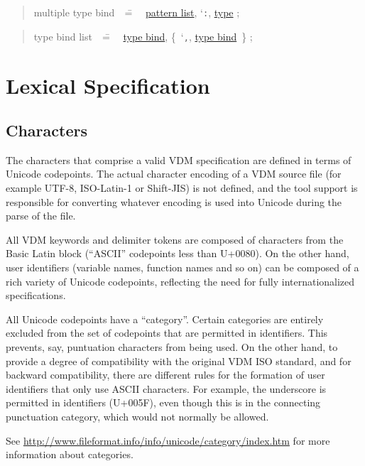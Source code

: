 \documentclass{overturerepchap}
\newcommand{\Lit}[1]{`{\tt #1}\Quote}
\newcommand{\Rule}[2]{
  \begin{quote}\begin{tabbing}
    #1\index{#1}\ \ \= = \ \ \= #2  ; %
    
  \end{tabbing}\end{quote}
  }
\newcommand{\RuleTarget}[1]{\hypertarget{rule:#1}{}}
\newcommand{\Ruledef}[2]
{
  \RuleTarget{#1}\Rule{#1}{#2}%
  }
\newcommand{\Ruleref}[1]{
  \hyperlink{rule:#1}{#1}}
\newcommand{\SeqPt}[1]{\{\ #1\ \}}
\begin{document}
\Ruledef{multiple type bind}{
  \Ruleref{pattern list}, \Lit{:}, \Ruleref{type}
  }

\Ruledef{type bind list}{
  \Ruleref{type bind}, \SeqPt{\Lit{,}, \Ruleref{type bind}}
  }

\chapter{Lexical Specification}\label{app-b}\label{ap:lexis}

\section{Characters}

The characters that comprise a valid VDM specification are defined in
terms of Unicode codepoints. The actual character encoding of a VDM
source file (for example UTF-8, ISO-Latin-1 or Shift-JIS) is not
defined, and the tool support is responsible for converting whatever
encoding is used into Unicode during the parse of the file. 

All VDM keywords and delimiter tokens are composed of characters from
the Basic Latin block (``ASCII'' codepoints less than U+0080). On the
other hand, user identifiers (variable names, function names and so
on) can be composed of a rich variety of Unicode codepoints,
reflecting the need for fully internationalized specifications. 

All Unicode codepoints have a ``category''. Certain categories are
entirely excluded from the set of codepoints that are permitted in
identifiers. This prevents, say, puntuation characters from being
used. On the other hand, to provide a degree of compatibility with the
original VDM ISO standard, and for backward compatibility, there are
different rules for the formation of user identifiers that only use
ASCII characters. For example, the underscore is permitted in
identifiers (U+005F), even though this is in the connecting
punctuation category, which would not normally be allowed. 

See \url{http://www.fileformat.info/info/unicode/category/index.htm} for
more information about categories. 
\end{document}
